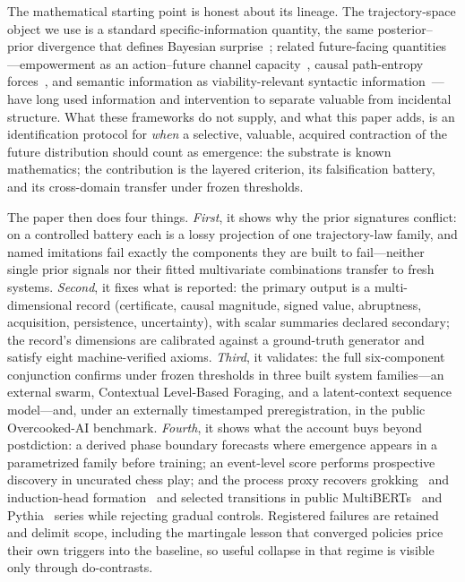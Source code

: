 \documentclass[11pt]{article}
\theoremstyle{definition}
\begin{document}
The mathematical starting point is honest about its lineage. The
trajectory-space object we use is a standard specific-information
quantity, the same posterior--prior divergence that defines Bayesian
surprise~\cite{ittibaldi2009,deweese1999}; related future-facing
quantities---empowerment as an action--future channel
capacity~\cite{klyubin2005,salge2014}, causal path-entropy
forces~\cite{wissnergross2013}, and semantic information as
viability-relevant syntactic information~\cite{kolchinsky2018}---have
long used information and intervention to separate valuable from
incidental structure. What these frameworks do not supply, and what
this paper adds, is an identification protocol for \emph{when} a
selective, valuable, acquired contraction of the future distribution
should count as emergence: the substrate is known mathematics; the
contribution is the layered criterion, its falsification battery, and
its cross-domain transfer under frozen thresholds.

The paper then does four things. \emph{First}, it shows why the prior
signatures conflict: on a controlled battery each is a lossy
projection of one trajectory-law family, and named imitations fail
exactly the components they are built to fail---neither single prior
signals nor their fitted multivariate combinations transfer to fresh
systems. \emph{Second}, it fixes what is reported: the primary output
is a multi-dimensional record (certificate, causal magnitude, signed
value, abruptness, acquisition, persistence, uncertainty), with scalar
summaries declared secondary; the record's dimensions are calibrated
against a ground-truth generator and satisfy eight machine-verified
axioms. \emph{Third}, it validates: the full six-component conjunction
confirms under frozen thresholds in three built system families---an
external swarm, Contextual Level-Based Foraging, and a latent-context
sequence model---and, under an externally timestamped preregistration,
in the public Overcooked-AI benchmark. \emph{Fourth}, it shows what
the account buys beyond postdiction: a derived phase boundary
forecasts where emergence appears in a parametrized family before
training; an event-level score performs prospective discovery in
uncurated chess play; and the process proxy recovers
grokking~\cite{power2022,nanda2023} and induction-head
formation~\cite{olsson2022,elhage2021} and selected transitions in
public MultiBERTs~\cite{sellam2022} and Pythia~\cite{biderman2023}
series while rejecting gradual controls. Registered failures are
retained and delimit scope, including the martingale lesson that
converged policies price their own triggers into the baseline, so
useful collapse in that regime is visible only through do-contrasts.
\end{document}
